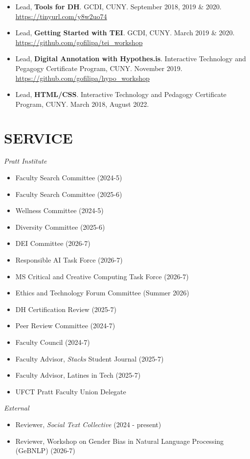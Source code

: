 \documentclass[a4paper,11pt]{article}
\begin{document}
\begin{itemize}
\url{https://github.com/gofilipa/bs4\_workshop}
\item Lead, \textbf{\textbf{Tools for DH}}. GCDI, CUNY. September 2018, 2019 \& 2020.
\url{https://tinyurl.com/y8w2uo74}
\item Lead, \textbf{\textbf{Getting Started with TEI}}. GCDI, CUNY. March 2019 \& 2020.
\url{https://github.com/gofilipa/tei\_workshop}
\item Lead, \textbf{\textbf{Digital Annotation with Hypothes.is}}. Interactive
Technology and Pegagogy Certificate Program, CUNY. November 2019.
\url{https://github.com/gofilipa/hypo\_workshop}
\item Lead, \textbf{\textbf{HTML/CSS}}. Interactive Technology and Pedagogy Certificate
Program, CUNY. March 2018, August 2022.
\end{itemize}
\section*{SERVICE}
\label{sec:org7681923}
\emph{Pratt Institute}
\begin{itemize}
\item Faculty Search Committee (2024-5)
\item Faculty Search Committee (2025-6)
\item Wellness Committee (2024-5)
\item Diversity Committee (2025-6)
\item DEI Committee (2026-7)
\item Responsible AI Task Force (2026-7)
\item MS Critical and Creative Computing Task Force (2026-7)
\item Ethics and Technology Forum Committee (Summer 2026)
\item DH Certification Review (2025-7)
\item Peer Review Committee (2024-7)
\item Faculty Council (2024-7)
\item Faculty Advisor, \emph{Stacks} Student Journal (2025-7)
\item Faculty Advisor, Latines in Tech (2025-7)
\item UFCT Pratt Faculty Union Delegate
\end{itemize}

\emph{External}
\begin{itemize}
\item Reviewer, \emph{Social Text Collective} (2024 - present)
\item Reviewer, Workshop on Gender Bias in Natural Language Processing
(GeBNLP) (2026-7)
\end{itemize}
\end{document}
